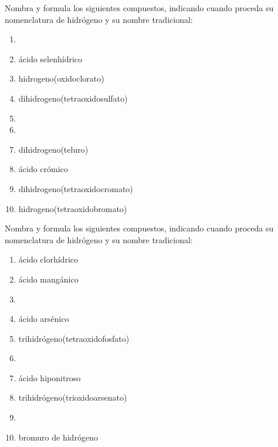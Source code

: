 \documentclass[10pt]{article}
\begin{document}
\begin{exercise}[
    tags    = {inorgánica,ácidos,ácidos binarios,ácidos ternarios,oxoácidos},
    topics  = {química inorgánica,formulación,nomenclatura},
    source  = {SAN Formulación, p28, e34},
  ]

  Nombra y formula los siguientes compuestos, indicando cuando proceda su nomenclatura de hidrógeno y su nombre tradicional:

  \begin{enumerate}
    \item {}
    \item ácido selenhídrico
    \item hidrogeno(oxidoclorato)
    \item dihidrogeno(tetraoxidosulfato)
    \item {}
    \item {}
    \item dihidrogeno(teluro)
    \item ácido crómico
    \item dihidrogeno(tetraoxidocromato)
    \item hidrogeno(tetraoxidobromato)
  \end{enumerate}
\end{exercise}


\begin{exercise}[
  tags    = {inorgánica,ácidos,ácidos binarios,ácidos ternarios,oxoácidos},
  topics  = {química inorgánica,formulación,nomenclatura},
  source  = {SAN Formulación, p28, e35},
  ]

  Nombra y formula los siguientes compuestos, indicando cuando proceda su nomenclatura de hidrógeno y su nombre tradicional:

  \begin{enumerate}
    \item ácido clorhídrico
    \item ácido mangánico
    \item {}
    \item ácido arsénico
    \item trihidrógeno(tetraoxidofosfato)
    \item {}
    \item ácido hiponitroso
    \item trihidrógeno(trioxidoarsenato)
    \item {}
    \item bromuro de hidrógeno
  \end{enumerate}
\end{exercise}
\end{document}
